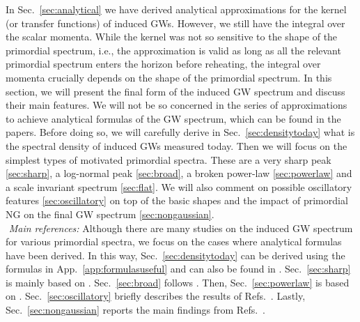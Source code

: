 \documentclass[a4paper,11pt]{article}
\numberwithin{equation}{section}
\begin{document}
In Sec.~\ref{sec:analytical} we have derived analytical approximations for the kernel (or transfer functions) of induced GWs. However, we still have the integral over the scalar momenta. While the kernel was not so sensitive to the shape of the primordial spectrum, i.e., the approximation is valid as long as all the relevant primordial spectrum enters the horizon before reheating, the integral over momenta crucially depends on the shape of the primordial spectrum. In this section, we will present the final form of the induced GW spectrum and discuss their main features. We will not be so concerned in the series of approximations to achieve analytical formulas of the GW spectrum, which can be found in the papers. Before doing so, we will carefully derive  in Sec.~\ref{sec:densitytoday} what is the spectral density of induced GWs measured today. Then we will focus on the simplest types of motivated primordial spectra. These are a very sharp peak \ref{sec:sharp}, a log-normal peak \ref{sec:broad}, a broken power-law \ref{sec:powerlaw} and a scale invariant spectrum \ref{sec:flat}. We will also comment on possible oscillatory features \ref{sec:oscillatory} on top of the basic shapes and the impact of primordial NG on the final GW spectrum \ref{sec:nongaussian}.\\

\noindent\faBook\,\,\textit{Main references:} Although there are many studies on the induced GW spectrum for various primordial spectra, we focus on the cases where analytical formulas have been derived. In this way, Sec.~\ref{sec:densitytoday} can be derived using the formulas in App.~\ref{app:formulasuseful} and can also be found in \cite{Domenech:2019quo,Domenech:2020kqm}. Sec.~\ref{sec:sharp} is mainly based on \cite{Domenech:2020kqm}. Sec.~\ref{sec:broad} follows \cite{Domenech:2020kqm,Pi:2020otn}. Then, Sec.~\ref{sec:powerlaw} is based on \cite{Atal:2021jyo}. Sec.~\ref{sec:oscillatory} briefly describes the results of Refs.~\cite{Fumagalli:2020nvq,Fumagalli:2021cel}. Lastly, Sec.~\ref{sec:nongaussian} reports the main findings from Refs.~\cite{Cai:2018dig,Unal:2018yaa,Adshead:2021hnm}.
\end{document}

